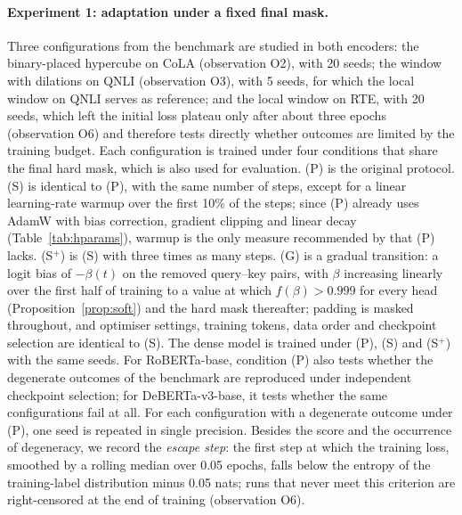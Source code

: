 \documentclass[10pt]{article}
\begin{document}
\paragraph{Experiment 1: adaptation under a fixed final mask.} Three configurations from the benchmark are studied in both encoders: the binary-placed hypercube on CoLA (observation O2), with 20 seeds; the window with dilations on QNLI (observation O3), with 5 seeds, for which the local window on QNLI serves as reference; and the local window on RTE, with 20 seeds, which left the initial loss plateau only after about three epochs (observation O6) and therefore tests directly whether outcomes are limited by the training budget. Each configuration is trained under four conditions that share the final hard mask, which is also used for evaluation. (P) is the original protocol. (S) is identical to (P), with the same number of steps, except for a linear learning-rate warmup over the first 10\% of the steps; since (P) already uses AdamW with bias correction, gradient clipping and linear decay (Table~\ref{tab:hparams}), warmup is the only measure recommended by \citet{mosbach2021stability} that (P) lacks. (S$^{+}$) is (S) with three times as many steps. (G) is a gradual transition: a logit bias of $-\beta(t)$ on the removed query--key pairs, with $\beta$ increasing linearly over the first half of training to a value at which $f(\beta)>0.999$ for every head (Proposition~\ref{prop:soft}) and the hard mask thereafter; padding is masked throughout, and optimiser settings, training tokens, data order and checkpoint selection are identical to (S). The dense model is trained under (P), (S) and (S$^{+}$) with the same seeds. For RoBERTa-base, condition (P) also tests whether the degenerate outcomes of the benchmark are reproduced under independent checkpoint selection; for DeBERTa-v3-base, it tests whether the same configurations fail at all. For each configuration with a degenerate outcome under (P), one seed is repeated in single precision. Besides the score and the occurrence of degeneracy, we record the \emph{escape step}: the first step at which the training loss, smoothed by a rolling median over 0.05 epochs, falls below the entropy of the training-label distribution minus 0.05 nats; runs that never meet this criterion are right-censored at the end of training (observation O6).
\end{document}
